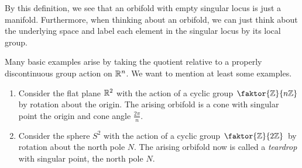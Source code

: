 By this definition, we see that an orbifold with empty singular locus is just a manifold.
Furthermore, when thinking about an orbifold, we can just think about the underlying space and label each element in the singular locus by its local group.

Many basic examples arise by taking the quotient relative to a properly discontinuous group action on \(\mathbb{R}^n\).
We want to mention at least some examples.

\begin{example} %
    \begin{enumerate}
        \item Consider the flat plane \(\mathbb{R}^2\) with the action of a cyclic group \(\faktor{\Z}{n\Z}\) by rotation about the origin.
            The arising orbifold is a cone with singular point the origin and cone angle \(\frac{2\pi}{n}\).
        
        \item Consider the sphere \(S^2\) with the action of a cyclic group \(\faktor{\Z}{2\Z}\) by rotation about the north pole \(N\).
            The arising orbifold now is called a \emph{teardrop} with singular point, the north pole \(N\).
            
    \end{enumerate}

    \begin{figure}[h!]
        \label{fig:orbifolds}
        \centering
        \hspace*{3cm}
    \end{figure}
\end{example}

